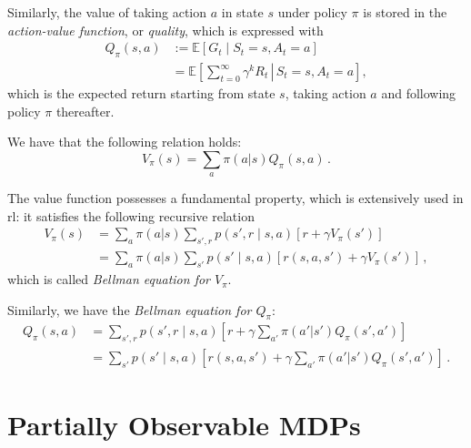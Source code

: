 Similarly, the value of taking action $a$ in state $s$ under policy $\pi$ is stored in the \emph{action-value function}, or \emph{quality}, which is expressed with
\begin{equation}
    \begin{aligned}
        Q_\pi(s,a)
        &:= \mathbb E \left[ G_t \mid S_t = s, A_t = a \right] \\
        &= \mathbb E \left[ \left. \sum_{t=0}^\infty \gamma^k R_t \, \right| \, S_t = s, A_t = a \right],
    \end{aligned}
    \label{eq:Q}
\end{equation}
which is the expected return starting from state $s$, taking action $a$ and following policy $\pi$ thereafter.

We have that the following relation holds:
\begin{equation}
    V_\pi(s) = \sum_a \pi(a|s) Q_\pi(s,a) \, .
\end{equation}

The value function possesses a fundamental property, which is extensively used in \acrshort{rl}: it satisfies the following recursive relation
\begin{equation}
    \begin{aligned}
        V_\pi (s)
        &= \sum_a \pi(a|s) \sum_{s', r} p(s', r \mid s, a) \left[ r + \gamma V_\pi (s') \right] \\
        &= \sum_a \pi(a|s) \sum_{s'} p(s' \mid s, a) \left[ r(s,a,s') + \gamma V_\pi (s') \right] \, ,
    \end{aligned}
\end{equation}
which is called \emph{Bellman equation for $V_\pi$}.

Similarly, we have the \emph{Bellman equation for $Q_\pi$}:
\begin{equation}
    \begin{aligned}
        Q_\pi (s, a)
        &= \sum_{s', r} p(s', r \mid s, a) \left[ r + \gamma \sum_{a'} \pi(a'|s')  Q_\pi (s', a') \right] \\
        &= \sum_{s'} p(s' \mid s, a) \left[ r(s,a,s') + \gamma \sum_{a'} \pi(a'|s')  Q_\pi (s', a') \right] \, .
    \end{aligned}
    \label{eq:Q-recursive}
\end{equation}


\section{Partially Observable MDPs}

